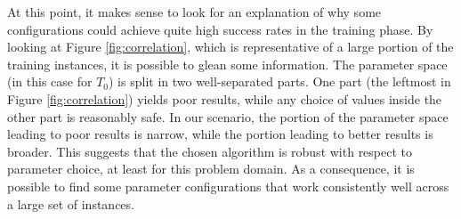 \documentclass[authoryear,12pt]{article}
\begin{document}
At this point, it makes sense to look for an explanation of why some
configurations could achieve quite high success rates in the training phase. By
looking at Figure \ref{fig:correlation}, which is representative of a large
portion of the training instances, it is possible to glean some information. The
parameter space (in this case for $T_{0}$) is split in two well-separated parts.
One part (the leftmost in Figure \ref{fig:correlation}) yields poor results,
while any choice of values inside the other part is reasonably safe. In our
scenario, the portion of the parameter space leading to poor results is narrow,
while the portion leading to better results is broader. This suggests that the
chosen algorithm is robust with respect to parameter choice, at least for this
problem domain. As a consequence, it is possible to find some parameter
configurations that work consistently well across a large set of instances.
\end{document}
